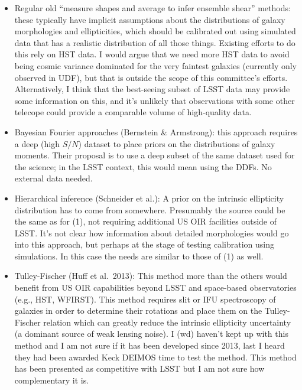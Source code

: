 \begin{itemize}
\item Regular old ``measure shapes and average to infer ensemble shear'' methods: these typically
  have implicit assumptions about the distributions of galaxy morphologies and ellipticities, which
  should be calibrated out using simulated data that has a realistic distribution of all those
  things.  Existing efforts to do this rely on HST data.  I would argue that we need more HST data
  to avoid being cosmic variance dominated for the very faintest galaxies (currently only observed
  in UDF), but that is outside the scope of this committee's efforts.  Alternatively, I think that
  the best-seeing subset of LSST data may provide some information on this, and it's unlikely that
  observations with some other telecope could provide a comparable volume of high-quality data.
\item Bayesian Fourier approaches (Bernstein \& Armstrong): this approach requires a deep (high
  $S/N$) dataset to place priors on the distributions of galaxy moments.  Their proposal is to use a
  deep subset of the same dataset used for the science; in the LSST context, this would mean using
  the DDFs.  No external data needed.
\item Hierarchical inference (Schneider et al.): A prior on the intrinsic ellipticity distribution
  has to come from somewhere.  Presumably the source could be the same as for (1), not requiring
  additional US OIR facilities outside of LSST.  It's not clear how information about detailed
  morphologies would go into this approach, but perhaps at the stage of testing calibration using
  simulations.  In this case the needs are similar to those of (1) as well.
\item Tulley-Fischer (Huff et al.~2013): This method more than the others would
  benefit from US OIR capabilities beyond LSST and space-based observatories
  (e.g., HST, WFIRST). This method requires slit or IFU spectroscopy of galaxies
  in order to determine their rotations and place them on the Tulley-Fischer
  relation which can greatly reduce the intrinsic ellipticity uncertainty (a
  dominant source of weak lensing noise). I (wd) haven't kept up with this
  method and I am not sure if it has been developed since 2013, last I heard
  they had been awarded Keck DEIMOS time to test the method. This method has
  been presented as competitive with LSST but I am not sure how complementary
  it is.
\end{itemize}

